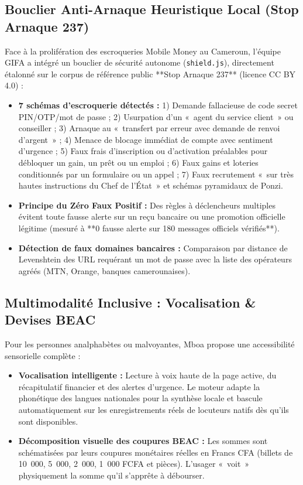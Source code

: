 \documentclass[10pt,a4paper]{article}
\begin{document}
\newpage

\subsection{Bouclier Anti-Arnaque Heuristique Local (Stop Arnaque 237)}
Face à la prolifération des escroqueries Mobile Money au Cameroun, l'équipe GIFA a intégré un bouclier de sécurité autonome (\texttt{shield.js}), directement étalonné sur le corpus de référence public **Stop Arnaque 237** (licence CC BY 4.0) :
\begin{itemize}
  \item \textbf{7 schémas d'escroquerie détectés :} 
  1) Demande fallacieuse de code secret PIN/OTP/mot de passe ; 
  2) Usurpation d'un «~agent du service client~» ou conseiller ; 
  3) Arnaque au «~transfert par erreur avec demande de renvoi d'argent~» ; 
  4) Menace de blocage immédiat de compte avec sentiment d'urgence ; 
  5) Faux frais d'inscription ou d'activation préalables pour débloquer un gain, un prêt ou un emploi ; 
  6) Faux gains et loteries conditionnés par un formulaire ou un appel ; 
  7) Faux recrutement «~sur très hautes instructions du Chef de l'État~» et schémas pyramidaux de Ponzi.
  \item \textbf{Principe du Zéro Faux Positif :} Des règles à déclencheurs multiples évitent toute fausse alerte sur un reçu bancaire ou une promotion officielle légitime (mesuré à **0 fausse alerte sur 180 messages officiels vérifiés**).
  \item \textbf{Détection de faux domaines bancaires :} Comparaison par distance de Levenshtein des URL requérant un mot de passe avec la liste des opérateurs agréés (MTN, Orange, banques camerounaises).
\end{itemize}

\subsection{Multimodalité Inclusive : Vocalisation \& Devises BEAC}
Pour les personnes analphabètes ou malvoyantes, Mboa propose une accessibilité sensorielle complète :
\begin{itemize}
  \item \textbf{Vocalisation intelligente :} Lecture à voix haute de la page active, du récapitulatif financier et des alertes d'urgence. Le moteur adapte la phonétique des langues nationales pour la synthèse locale et bascule automatiquement sur les enregistrements réels de locuteurs natifs dès qu'ils sont disponibles.
  \item \textbf{Décomposition visuelle des coupures BEAC :} Les sommes sont schématisées par leurs coupures monétaires réelles en Francs CFA (billets de 10~000, 5~000, 2~000, 1~000 FCFA et pièces). L'usager «~voit~» physiquement la somme qu'il s'apprête à débourser.
\end{itemize}
\end{document}
